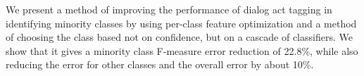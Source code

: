 We present a method of improving the performance of dialog act tagging in identifying minority
 classes by using per-class feature optimization
 and a method of choosing the class
 based not on confidence, but on a cascade of
 classifiers. We show that it gives a minority
 class F-measure error reduction of 22.8\%,
 while also reducing the error for other classes
 and the overall error by about 10\%.

